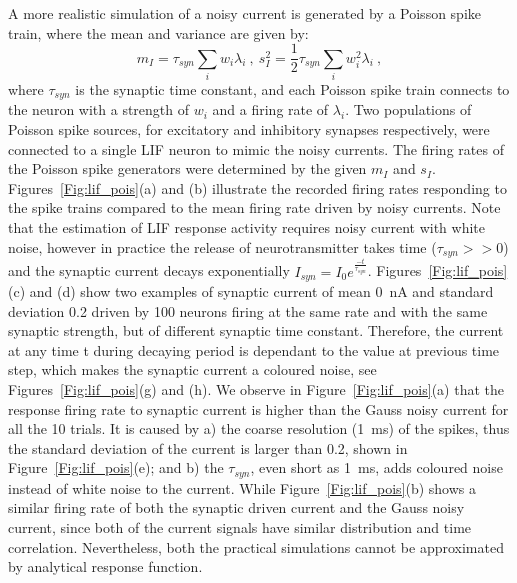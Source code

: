 	A more realistic simulation of a noisy current is generated by a Poisson spike train, 
	where the mean and variance are given by:
	\begin{equation}
	m_I = \tau_{syn}\sum_i w_i\lambda_{i}~, ~s_I^2=\frac{1}{2}\tau_{syn}\sum_i w_i^2\lambda_{i}~,
	\label{equ:distr}
	\end{equation}
	where $\tau_{syn}$ is the synaptic time constant, and each Poisson spike train connects to the neuron with a strength of $w_i$ and a firing rate of $\lambda_i$.
	Two populations of Poisson spike sources, for excitatory and inhibitory synapses respectively, were connected to a single LIF neuron to mimic the noisy currents.
	The firing rates of the Poisson spike generators were determined by the given $m_I$ and $s_I$.
	Figures~\ref{Fig:lif_pois}(a) and (b) illustrate the recorded firing rates responding to the spike trains compared to the mean firing rate driven by noisy currents.
	Note that the estimation of LIF response activity requires noisy current with white noise, however
	in practice the release of neurotransmitter takes time ($\tau_{syn} >> 0$) and the synaptic current decays exponentially $I_{syn} = I_0 e^{\frac{-t}{\tau_{syn}}}$.
	Figures~\ref{Fig:lif_pois}(c) and (d) show two examples of synaptic current of mean 0~nA and standard deviation 0.2 driven by 100 neurons firing at the same rate and with the same synaptic strength, but of different synaptic time constant.
	Therefore, the current at any time t during decaying period is dependant to the value at previous time step, which makes the synaptic current a coloured noise, see Figures~\ref{Fig:lif_pois}(g) and (h).
	We observe in Figure~\ref{Fig:lif_pois}(a) that the response firing rate to synaptic current is higher than the Gauss noisy current for all the 10 trials.
	It is caused by a) the coarse resolution (1~ms) of the spikes, thus the standard deviation of the current is larger than 0.2, shown in Figure~\ref{Fig:lif_pois}(e);
	and b) the $\tau_{syn}$, even short as 1~ms, adds coloured noise instead of white noise to the current.
	While Figure~\ref{Fig:lif_pois}(b) shows a similar firing rate of both the synaptic driven current and the Gauss noisy current, since both of the current signals have similar distribution and time correlation.
	Nevertheless, both the practical simulations cannot be approximated by analytical response function.
	
